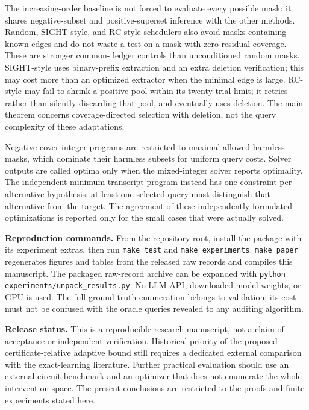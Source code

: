 \documentclass[10pt]{article}
\theoremstyle{definition}\newtheorem{definition}[theorem]{Definition}
\begin{document}
The increasing-order baseline is not forced to evaluate every possible mask: it
shares negative-subset and positive-superset inference with the other methods. Random,
SIGHT-style, and RC-style schedulers also avoid masks containing known edges and do
not waste a test on a mask with zero residual coverage. These are stronger common-
ledger controls than unconditioned random masks. SIGHT-style uses binary-prefix
extraction and an extra deletion verification; this may cost more than an optimized
extractor when the minimal edge is large. RC-style may fail to shrink a positive
pool within its twenty-trial limit; it retries rather than silently discarding that
pool, and eventually uses deletion. The main theorem concerns coverage-directed
selection with deletion, not the query complexity of these adaptations.

Negative-cover integer programs are restricted to maximal allowed harmless masks,
which dominate their harmless subsets for uniform query costs. Solver outputs are
called optima only when the mixed-integer solver reports optimality. The independent
minimum-transcript program instead has one constraint per alternative hypothesis:
at least one selected query must distinguish that alternative from the target.
The agreement of these independently formulated optimizations is reported only for
the small cases that were actually solved.

\begin{table}[h]
\centering\small
\caption{Intervention-radius sweep with six disjoint pairs, declared rank twelve,
and twenty tie-breaking seeds per ceiling. All six true pairs are eventually found
at every ceiling, but only $b=6$ permits full identification.}
\end{table}

\textbf{Reproduction commands.} From the repository root, install the package with
its experiment extras, then run \texttt{make test} and \texttt{make experiments}.
\texttt{make paper} regenerates figures and tables from the released raw records
and compiles this manuscript. The packaged raw-record archive can be expanded with
\texttt{python experiments/unpack\_results.py}. No LLM API, downloaded model weights,
or GPU is used. The full ground-truth enumeration belongs to validation; its cost
must not be confused with the oracle queries revealed to any auditing algorithm.

\textbf{Release status.} This is a reproducible research manuscript, not a claim of
acceptance or independent verification. Historical priority of the proposed
certificate-relative adaptive bound still requires a dedicated external comparison
with the exact-learning literature. Further practical evaluation should use an
external circuit benchmark and an optimizer that does not enumerate the whole
intervention space. The present conclusions are restricted to the proofs and
finite experiments stated here.
\end{document}

